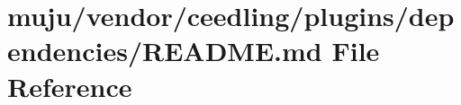 \hypertarget{vendor_2ceedling_2plugins_2dependencies_2_r_e_a_d_m_e_8md}{}\section{muju/vendor/ceedling/plugins/dependencies/\+R\+E\+A\+D\+ME.md File Reference}
\label{vendor_2ceedling_2plugins_2dependencies_2_r_e_a_d_m_e_8md}
